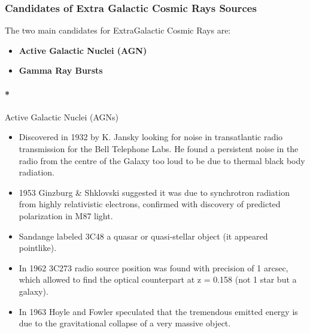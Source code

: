 \documentclass[
  letterpaper,
  DIV=11,
  numbers=noendperiod]{scrreprt}
\let\oldparagraph\paragraph
\renewcommand{\paragraph}[1]{\oldparagraph{#1}\mbox{}}
\providecommand{\tightlist}{%
  \setlength{\itemsep}{0pt}\setlength{\parskip}{0pt}}\usepackage{longtable,booktabs,array}
\begin{document}
\subsubsection*{Candidates of Extra Galactic Cosmic Rays
Sources}\label{candidates-of-extra-galactic-cosmic-rays-sources}

The two main candidates for ExtraGalactic Cosmic Rays are:

\begin{itemize}
\tightlist
\item
  \textbf{Active Galactic Nuclei (AGN)}
\item
  \textbf{Gamma Ray Bursts}
\end{itemize}

\paragraph*{Active Galactic Nuclei
(AGNs)}\label{active-galactic-nuclei-agns}

\begin{itemize}
\item
  Discovered in 1932 by K. Jansky looking for noise in transatlantic
  radio transmission for the Bell Telephone Labs. He found a persistent
  noise in the radio from the centre of the Galaxy too loud to be due to
  thermal black body radiation.
\item
  1953 Ginzburg \& Shklovski suggested it was due to synchrotron
  radiation from highly relativistic electrons, confirmed with discovery
  of predicted polarization in M87 light.
\item
  Sandange labeled 3C48 a quasar or quasi-stellar object (it appeared
  pointlike).
\item
  In 1962 3C273 radio source position was found with precision of 1
  arcsec, which allowed to find the optical counterpart at z = 0.158
  (not 1 star but a galaxy).
\item
  In 1963 Hoyle and Fowler speculated that the tremendous emitted energy
  is due to the gravitational collapse of a very massive object.
\end{itemize}
\end{document}
